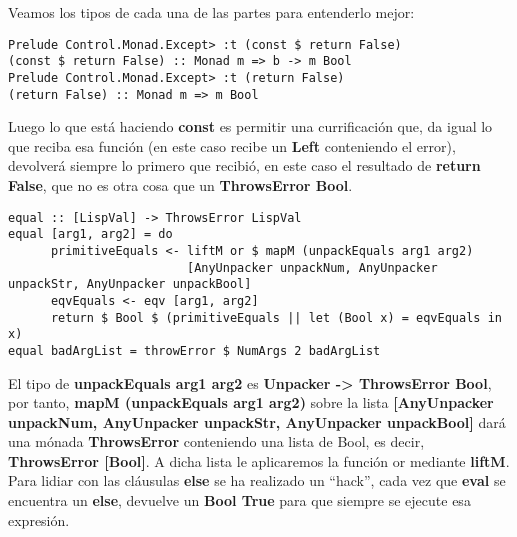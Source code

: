 Veamos los tipos de cada una de las partes para entenderlo mejor:\\

\begin{minipage}{\linewidth}
\begin{small}
\begin{lstlisting}[frame=single]
Prelude Control.Monad.Except> :t (const $ return False)
(const $ return False) :: Monad m => b -> m Bool
Prelude Control.Monad.Except> :t (return False)
(return False) :: Monad m => m Bool
\end{lstlisting}
\end{small}
\end{minipage}

Luego lo que est\'a haciendo \textbf{const} es permitir una currificaci\'on que, da igual lo que reciba esa funci\'on (en este caso recibe un \textbf{Left} conteniendo el error), devolver\'a siempre lo primero que recibi\'o, en este caso el resultado de \textbf{return False}, que no es otra cosa que un \textbf{ThrowsError Bool}.\\

\begin{minipage}{\linewidth}
\begin{small}
\begin{lstlisting}[frame=single]
equal :: [LispVal] -> ThrowsError LispVal
equal [arg1, arg2] = do
      primitiveEquals <- liftM or $ mapM (unpackEquals arg1 arg2) 
                         [AnyUnpacker unpackNum, AnyUnpacker unpackStr, AnyUnpacker unpackBool]
      eqvEquals <- eqv [arg1, arg2]
      return $ Bool $ (primitiveEquals || let (Bool x) = eqvEquals in x)
equal badArgList = throwError $ NumArgs 2 badArgList
\end{lstlisting}
\end{small}
\end{minipage}

El tipo de \textbf{unpackEquals arg1 arg2} es \textbf{Unpacker -> ThrowsError Bool}, por tanto, \textbf{mapM (unpackEquals arg1 arg2)} sobre la lista \textbf{[AnyUnpacker unpackNum, AnyUnpacker unpackStr, AnyUnpacker unpackBool]} dar\'a una m\'onada \textbf{ThrowsError} conteniendo una lista de Bool, es decir, \textbf{ThrowsError [Bool]}. A dicha lista le aplicaremos la funci\'on or mediante \textbf{liftM}.\\

Para lidiar con las cl\'ausulas \textbf{else} se ha realizado un ``hack'', cada vez que \textbf{eval} se encuentra un \textbf{else}, devuelve un \textbf{Bool True} para que siempre se ejecute esa expresi\'on.\\